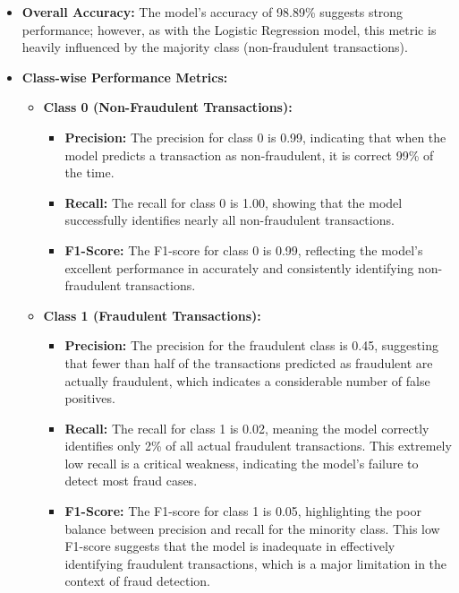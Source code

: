 \documentclass[12pt,a4paper]{report}
\begin{document}
\begin{itemize}
    \item \textbf{Overall Accuracy:} The model's accuracy of 98.89\% suggests strong performance; however, as with the Logistic Regression model, this metric is heavily influenced by the majority class (non-fraudulent transactions).

    \item \textbf{Class-wise Performance Metrics:}
    \begin{itemize}
        \item \textbf{Class 0 (Non-Fraudulent Transactions):}
        \begin{itemize}
            \item \textbf{Precision:} The precision for class 0 is 0.99, indicating that when the model predicts a transaction as non-fraudulent, it is correct 99\% of the time.
            \item \textbf{Recall:} The recall for class 0 is 1.00, showing that the model successfully identifies nearly all non-fraudulent transactions.
            \item \textbf{F1-Score:} The F1-score for class 0 is 0.99, reflecting the model's excellent performance in accurately and consistently identifying non-fraudulent transactions.
        \end{itemize}
        \item \textbf{Class 1 (Fraudulent Transactions):}
        \begin{itemize}
            \item \textbf{Precision:} The precision for the fraudulent class is 0.45, suggesting that fewer than half of the transactions predicted as fraudulent are actually fraudulent, which indicates a considerable number of false positives.
            \item \textbf{Recall:} The recall for class 1 is 0.02, meaning the model correctly identifies only 2\% of all actual fraudulent transactions. This extremely low recall is a critical weakness, indicating the model's failure to detect most fraud cases.
            \item \textbf{F1-Score:} The F1-score for class 1 is 0.05, highlighting the poor balance between precision and recall for the minority class. This low F1-score suggests that the model is inadequate in effectively identifying fraudulent transactions, which is a major limitation in the context of fraud detection.
        \end{itemize}
    \end{itemize}


\end{itemize}
\end{document}
